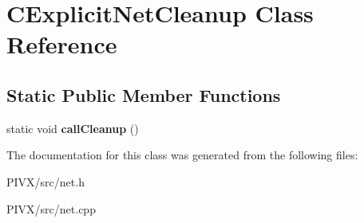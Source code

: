 \hypertarget{class_c_explicit_net_cleanup}{}\section{C\+Explicit\+Net\+Cleanup Class Reference}
\label{class_c_explicit_net_cleanup}
\subsection*{Static Public Member Functions}
\begin{DoxyCompactItemize}
\item 
\mbox{\label{class_c_explicit_net_cleanup_a381b3aec88e5c9432d3777525682c8f5}} 
static void {\bfseries call\+Cleanup} ()
\end{DoxyCompactItemize}


The documentation for this class was generated from the following files\+:\begin{DoxyCompactItemize}
\item 
P\+I\+V\+X/src/net.\+h\item 
P\+I\+V\+X/src/net.\+cpp\end{DoxyCompactItemize}
